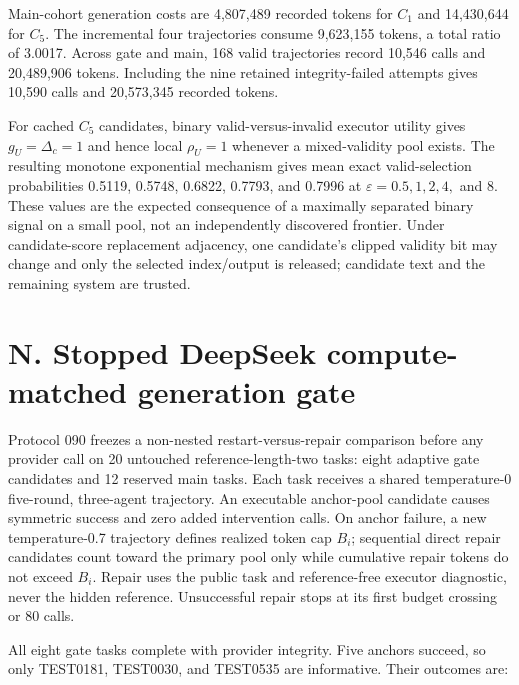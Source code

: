 \documentclass{article}
\begin{document}
Main-cohort generation costs are 4,807,489 recorded tokens for \(C_1\) and 14,430,644 for \(C_5\). The incremental four trajectories consume 9,623,155 tokens, a total ratio of 3.0017. Across gate and main, 168 valid trajectories record 10,546 calls and 20,489,906 tokens. Including the nine retained integrity-failed attempts gives 10,590 calls and 20,573,345 recorded tokens.

For cached \(C_5\) candidates, binary valid-versus-invalid executor utility gives \(g_U=\Delta_c=1\) and hence local \(\rho_U=1\) whenever a mixed-validity pool exists. The resulting monotone exponential mechanism gives mean exact valid-selection probabilities 0.5119, 0.5748, 0.6822, 0.7793, and 0.7996 at \(\varepsilon=0.5, 1, 2, 4,\) and \(8\). These values are the expected consequence of a maximally separated binary signal on a small pool, not an independently discovered frontier. Under candidate-score replacement adjacency, one candidate's clipped validity bit may change and only the selected index/output is released; candidate text and the remaining system are trusted.

\section{N. Stopped DeepSeek compute-matched generation gate}

Protocol 090 freezes a non-nested restart-versus-repair comparison before any provider call on 20 untouched reference-length-two tasks: eight adaptive gate candidates and 12 reserved main tasks. Each task receives a shared temperature-0 five-round, three-agent trajectory. An executable anchor-pool candidate causes symmetric success and zero added intervention calls. On anchor failure, a new temperature-0.7 trajectory defines realized token cap \(B_i\); sequential direct repair candidates count toward the primary pool only while cumulative repair tokens do not exceed \(B_i\). Repair uses the public task and reference-free executor diagnostic, never the hidden reference. Unsuccessful repair stops at its first budget crossing or 80 calls.

All eight gate tasks complete with provider integrity. Five anchors succeed, so only TEST0181, TEST0030, and TEST0535 are informative. Their outcomes are:

\begin{center}
\end{center}
\end{document}
